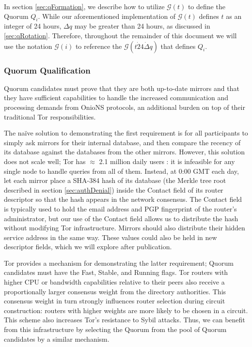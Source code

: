 \documentclass[USenglish,oneside,twocolumn]{article}
\begin{document}
In section \ref{sec:qFormation}, we describe how to utilize $ \mathcal{G}(t) $ to define the Quorum $ Q_{i} $. While our aforementioned implementation of $ \mathcal{G}(t) $ defines $ t $ as an integer of 24 hours, $ \Delta q $ may be greater than 24 hours, as discussed in \ref{sec:qRotation}. Therefore, throughout the remainder of this document we will use the notation $ \mathcal{G}(i) $ to reference the $ \mathcal{G}(t \dot 24 \dot \Delta q) $ that defines $ Q_{i} $.

\subsubsection{Quorum Qualification} %

Quorum candidates must prove that they are both up-to-date mirrors and that they have sufficient capabilities to handle the increased communication and processing demands from OnioNS protocols, an additional burden on top of their traditional Tor responsibilities.

The na\"{i}ve solution to demonstrating the first requirement is for all participants to simply ask mirrors for their internal database, and then compare the recency of its database against the databases from the other mirrors. However, this solution does not scale well; Tor has $ \approx $ 2.1 million daily users \cite{TorMetrics}: it is infeasible for any single node to handle queries from all of them. Instead, at 0:00 GMT each day, let each mirror place a SHA-384 hash of its database (the Merkle tree root described in section \ref{sec:authDenial}) inside the Contact field of its router descriptor so that the hash appears in the network consensus. The Contact field is typically used to hold the email address and PGP fingerprint of the router's administrator, but our use of the Contact field allows us to distribute the hash without modifying Tor infrastructure. Mirrors should also distribute their hidden service address in the same way. These values could also be held in new descriptor fields, which we will explore after publication.

Tor provides a mechanism for demonstrating the latter requirement; Quorum candidates must have the Fast, Stable, and Running flags. Tor routers with higher CPU or bandwidth capabilities relative to their peers also receive a proportionally larger consensus weight from the directory authorities. This consensus weight in turn strongly influences router selection during circuit construction: routers with higher weights are more likely to be chosen in a circuit. This scheme also increases Tor's resistance to Sybil attacks. Thus, we can benefit from this infrastructure by selecting the Quorum from the pool of Quorum candidates by a similar mechanism.
\end{document}
